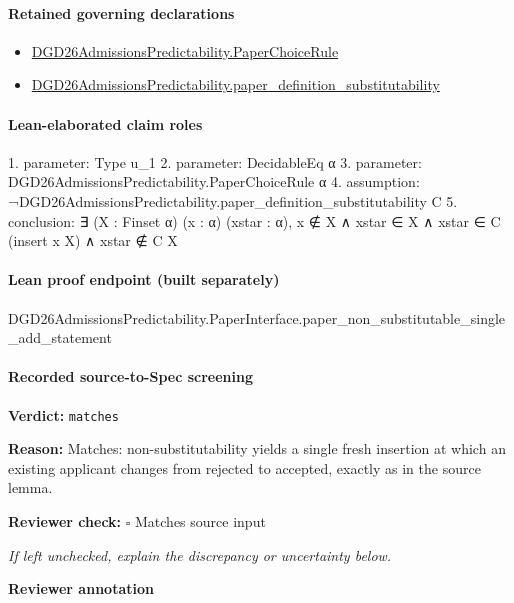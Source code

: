\documentclass[10pt]{article}
\newcommand{\reviewerbox}{%
  \par\noindent\fbox{\parbox{0.96\linewidth}{\rule{0pt}{0.38in}}}\par
}
\newcommand{\reviewmatch}[1]{%
  \par\noindent\textbf{Reviewer check:} $\square$\; #1\par
  \noindent\emph{If left unchecked, explain the discrepancy or uncertainty below.}\par
}
\begin{document}
\paragraph{Retained governing declarations}
\begin{itemize}\raggedright
\item \hyperlink{governing-declaration-4678951b4432b184}{DGD26\allowbreak{}Admissions\allowbreak{}Predictability.\allowbreak{}Paper\allowbreak{}Choice\allowbreak{}Rule}
\item \hyperlink{governing-declaration-39cdd64a379d386b}{DGD26\allowbreak{}Admissions\allowbreak{}Predictability.\allowbreak{}paper\_\allowbreak{}definition\_\allowbreak{}substitutability}
\end{itemize}
\paragraph{Lean-elaborated claim roles}\begin{ReviewVerbatim}
1. parameter: Type u_1
2. parameter: DecidableEq α
3. parameter: DGD26AdmissionsPredictability.PaperChoiceRule α
4. assumption: ¬DGD26AdmissionsPredictability.paper_definition_substitutability C
5. conclusion: ∃ (X : Finset α) (x : α) (xstar : α), x ∉ X ∧ xstar ∈ X ∧ xstar ∈ C (insert x X) ∧ xstar ∉ C X
\end{ReviewVerbatim}

\paragraph{Lean proof endpoint (built separately)}\begin{ReviewVerbatim}
DGD26AdmissionsPredictability.PaperInterface.paper_non_substitutable_single_add_statement
\end{ReviewVerbatim}

\paragraph{Recorded source-to-Spec screening}
\textbf{Verdict:} \texttt{matches}
\\
{\raggedright
\textbf{Reason:} Matches:\allowbreak{} non-\allowbreak{}substitutability yields a single fresh insertion at which an existing applicant changes from rejected to accepted, exactly as in the source lemma.\allowbreak{}
\par}
\reviewmatch{Matches source input}
\noindent\textbf{Reviewer annotation}\par
\reviewerbox
\clearpage
\hypertarget{source-claim-bc7eeffb236e6569}{}
\end{document}
